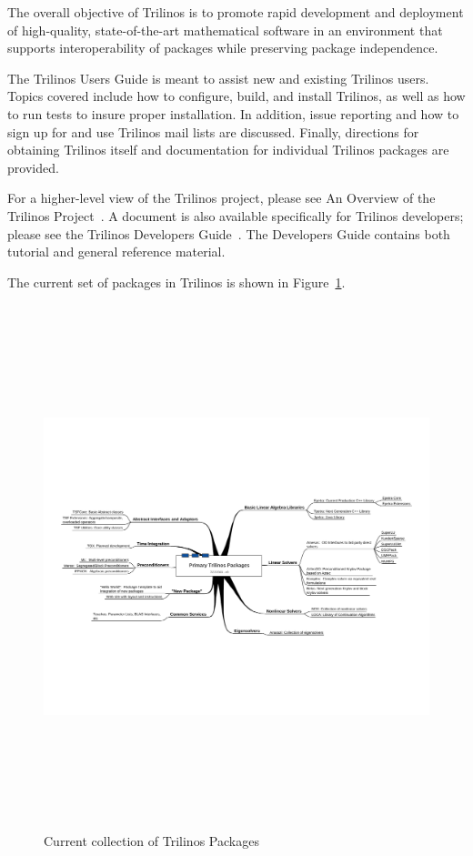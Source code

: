 \documentclass[12pt,relax]{TrilinosUserGuide}
\begin{document}
The overall objective of Trilinos is to promote rapid development and
deployment of high-quality, state-of-the-art mathematical software in
an environment that supports interoperability of packages while
preserving package independence. 

The Trilinos Users Guide is meant to assist new and existing
Trilinos users.  Topics covered include how to configure, build, and install
Trilinos, as well as how to run tests to insure proper installation.  In 
addition, issue reporting and how to sign up for and use Trilinos mail lists 
are discussed.  Finally, directions for obtaining Trilinos itself and 
documentation for individual Trilinos packages are provided.


For a higher-level view of the Trilinos project, please see An Overview
of the Trilinos Project~\cite{Trilinos-Overview}.  A document is also 
available specifically for Trilinos developers; please see the Trilinos 
Developers Guide~\cite{Trilinos-Dev-Guide}.  The Developers Guide contains 
both tutorial and general reference material.  

The current set of packages in Trilinos is shown in 
Figure~\ref{Figure:TrilinosPackages}.

\begin{figure}
\begin{center}
\includegraphics[height=6in,angle=90]{../CommonFiles/TrilinosPackagesDiagram}
\end{center}
\caption{\label{Figure:TrilinosPackages}Current collection of Trilinos Packages}
\end{figure}
\end{document}
